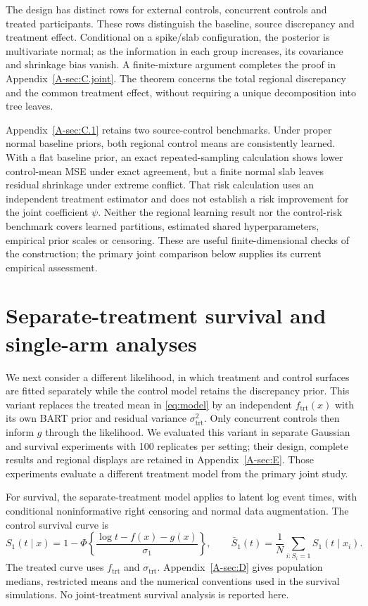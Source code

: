 \documentclass[11pt]{article}
\begin{document}
The design has distinct rows for external controls, concurrent controls and treated participants. These rows distinguish the baseline, source discrepancy and treatment effect. Conditional on a spike/slab configuration, the posterior is multivariate normal; as the information in each group increases, its covariance and shrinkage bias vanish. A finite-mixture argument completes the proof in Appendix~\ref{A-sec:C.joint}. The theorem concerns the total regional discrepancy and the common treatment effect, without requiring a unique decomposition into tree leaves.

Appendix~\ref{A-sec:C.1} retains two source-control benchmarks. Under proper normal baseline priors, both regional control means are consistently learned. With a flat baseline prior, an exact repeated-sampling calculation shows lower control-mean MSE under exact agreement, but a finite normal slab leaves residual shrinkage under extreme conflict. That risk calculation uses an independent treatment estimator and does not establish a risk improvement for the joint coefficient $\psi$. Neither the regional learning result nor the control-risk benchmark covers learned partitions, estimated shared hyperparameters, empirical prior scales or censoring. These are useful finite-dimensional checks of the construction; the primary joint comparison below supplies its current empirical assessment.



\section{Separate-treatment survival and single-arm analyses}\label{sec:variant}
We next consider a different likelihood, in which treatment and control surfaces are fitted separately while the control model retains the discrepancy prior. This variant replaces the treated mean in \eqref{eq:model} by an independent $f_{\mathrm{trt}}(x)$ with its own BART prior and residual variance $\sigma_{\mathrm{trt}}^2$. Only concurrent controls then inform $g$ through the likelihood. We evaluated this variant in separate Gaussian and survival experiments with 100 replicates per setting; their design, complete results and regional displays are retained in Appendix~\ref{A-sec:E}. Those experiments evaluate a different treatment model from the primary joint study.

For survival, the separate-treatment model applies to latent log event times, with conditional noninformative right censoring and normal data augmentation. The control survival curve is
\begin{equation}\label{eq:survival}
S_1(t\mid x)=1-\Phi\!\left\{\frac{\log t-f(x)-g(x)}{\sigma_1}\right\},\qquad
\bar S_1(t)=\frac1N\sum_{i:S_i=1}S_1(t\mid x_i).
\end{equation}
The treated curve uses $f_{\mathrm{trt}}$ and $\sigma_{\mathrm{trt}}$. Appendix~\ref{A-sec:D} gives population medians, restricted means and the numerical conventions used in the survival simulations. No joint-treatment survival analysis is reported here.
\end{document}
